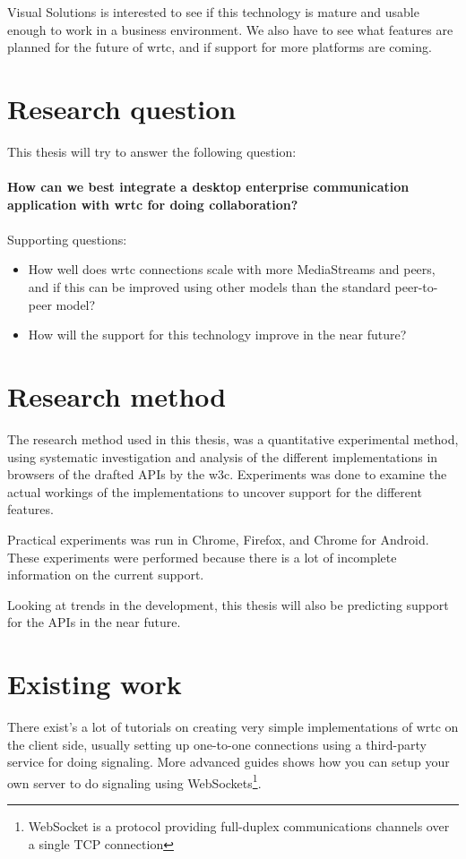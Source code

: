 Visual Solutions is interested to see if this technology is mature and usable enough to work in a business environment. We also have to see what features are planned for the future of \gls{wrtc}, and if support for more platforms are coming.


\section{Research question}
This thesis will try to answer the following question:
\\
\\
\textbf{How can we best integrate a desktop enterprise communication application with \gls{wrtc} for doing collaboration?}
\\
\\
Supporting questions:

\begin{itemize}
    \item How well does \gls{wrtc} connections scale with more MediaStreams and peers, and if this can be improved using other models than the standard peer-to-peer model?
    \item How will the support for this technology improve in the near future?
\end{itemize}


\section{Research method}
The research method used in this thesis, was a quantitative experimental method, using systematic investigation and analysis of the different implementations in browsers of the drafted APIs by the \gls{w3c}. Experiments was done to examine the actual workings of the implementations to uncover support for the different features.

Practical experiments was run in Chrome, Firefox, and Chrome for Android. These experiments were performed because there is a lot of incomplete information on the current support.

Looking at trends in the development, this thesis will also be predicting support for the APIs in the near future.


\section{Existing work}
There exist's a lot of tutorials on creating very simple implementations of \gls{wrtc} on the client side, usually setting up one-to-one connections using a third-party service for doing signaling. More advanced guides shows how you can setup your own server to do signaling using WebSockets\footnote{WebSocket is a protocol providing full-duplex communications channels over a single TCP connection}.

